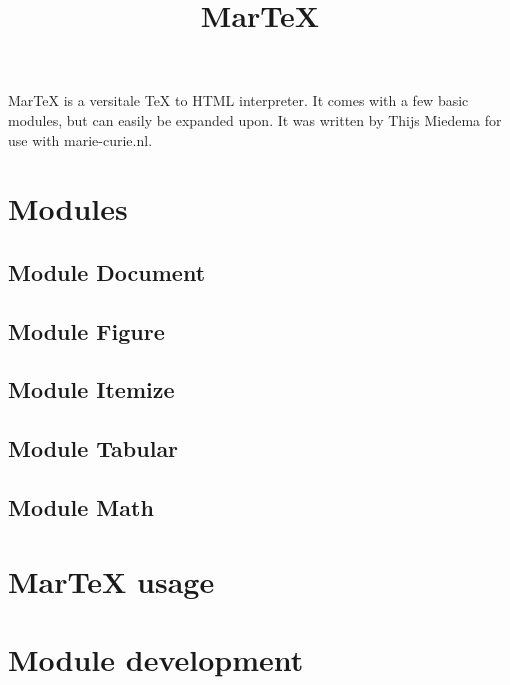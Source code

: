 \begin{page}

\usepackage{document}
\usepackage{itemize}
\usepackage{tabular}
\usepackage{ifthen}


\title{MarTeX}
	\hline
	\begin{paragraph}
		MarTeX is a versitale TeX to HTML interpreter. 
		It comes with a few basic modules, but can easily be expanded upon. 
		It was written by Thijs Miedema for use with marie-curie.nl.
	\end{paragraph}
	\section{Modules}
		\subsection{Module Document}
			
		\subsection{Module Figure}
			
		\subsection{Module Itemize}
			
		\subsection{Module Tabular}
			
		\subsection{Module Math}
		    
	\section{MarTeX usage}
		
	\section{Module development}
		

\end{page}
